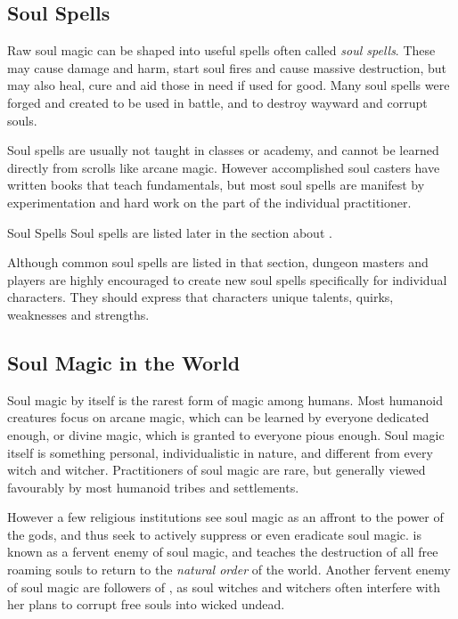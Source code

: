 \subsection{Soul Spells}
\label{sec:Soul Spells}

Raw soul magic can be shaped into useful spells often called \emph{soul spells}.
These may cause damage and harm, start soul fires and cause massive destruction,
but may also heal, cure and aid those in need if used for good. Many soul spells
were forged and created to be used in battle, and to destroy wayward and corrupt
souls.

Soul spells are usually not taught in classes or academy, and cannot be learned
directly from scrolls like arcane magic. However accomplished soul casters have
written books that teach fundamentals, but most soul spells are manifest by
experimentation and hard work on the part of the individual practitioner.

\begin{35e}{Soul Spells}
  Soul spells are listed later in the section about .

  Although common soul spells are listed in that section, dungeon masters and
  players are highly encouraged to create new soul spells specifically for
  individual characters. They should express that characters unique talents,
  quirks, weaknesses and strengths.
\end{35e}

\subsection{Soul Magic in the World}
\label{sec:Soul Magic in the World}

Soul magic by itself is the rarest form of magic among humans. Most humanoid
creatures focus on arcane magic, which can be learned by everyone dedicated
enough, or divine magic, which is granted to everyone pious enough. Soul magic
itself is something personal, individualistic in nature, and different from
every witch and witcher. Practitioners of soul magic are rare, but generally
viewed favourably by most humanoid tribes and settlements.

However a few religious institutions see soul magic as an affront to the power
of the gods, and thus seek to actively suppress or even eradicate soul magic.
 is known as a fervent enemy of soul magic, and teaches the
destruction of all free roaming souls to return to the \emph{natural order} of
the world. Another fervent enemy of soul magic are followers of
, as soul witches and witchers often interfere with her
plans to corrupt free souls into wicked undead.
